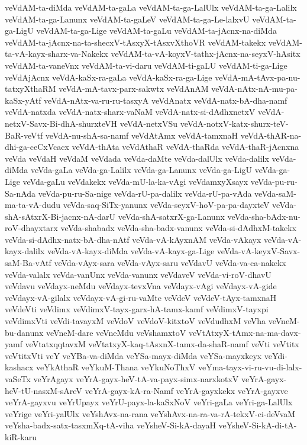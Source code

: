 {veVdAM-ta-diMda
veVdAM-ta-gaLa
veVdAM-ta-ga-LalUlx
veVdAM-ta-ga-Lalilx
veVdAM-ta-ga-Lanunx
veVdAM-ta-gaLeV
veVdAM-ta-ga-Le-lalxvU
veVdAM-ta-ga-LigU
veVdAM-ta-ga-Lige
veVdAM-ta-gaLu
veVdAM-ta-jAcnx-na-diMda
veVdAM-ta-jAcnx-na-ta-shecxV-tAsxyX-tAsxvXthoVR
veVdAM-takekx
veVdAM-ta-vA-kayx-sharx-va-Nakekx
veVdAM-ta-vA-koyxV-tathx-jAcnx-na-seyxV-hAsitx
veVdAM-ta-vaneVnx
veVdAM-ta-vi-daru
veVdAM-ti-gaLU
veVdAM-ti-ga-Lige
veVdAjAcnx
veVdA-kaSx-ra-gaLa
veVdA-kaSx-ra-ga-Lige
veVdA-mA-tAvx-pa-nu-tatxyXthaRM
veVdA-mA-tavx-parx-sakwtx
veVdAnAM
veVdA-nAtx-nA-mu-pa-kaSx-yAtf
veVdA-nAtx-va-ru-ru-tasxyA
veVdAnatx
veVdA-natx-bA-dha-namf
veVdA-natxda
veVdA-natx-sharx-vaNaM
veVdA-natx-si-dAdhxnetxV
veVdA-netxV-Savx-Bi-dhA-shurxteVH
veVdA-netxVSu
veVdA-notxV-katx-shurx-teV-BaR-veVtf
veVdA-nu-shA-sa-namf
veVdAtAmx
veVdA-tamxnaH
veVdA-thAR-na-dhi-ga-ceCxVcacx
veVdA-thAta
veVdAthaR
veVdA-thaRda
veVdA-thaR-jAcnxna
veVda
veVdaH
veVdaM
veVdada
veVda-daMte
veVda-dalUlx
veVda-dalilx
veVda-diMda
veVda-gaLa
veVda-ga-Lalilx
veVda-ga-Lanunx
veVda-ga-LigU
veVda-ga-Lige
veVda-gaLu
veVdakekx
veVda-mU-la-ka-vAgi
veVdamxyXsayx
veVda-pu-ru-Sa-nAda
veVda-pu-ru-Sa-nige
veVda-rU-pa-dalilx
veVda-rU-pa-vAda
veVda-saM-ma-ta-vA-dudu
veVda-saq-SiTx-yanunx
veVda-seyxV-hoV-pa-pa-dayxteV
veVda-shA-sAtxrX-Bi-jacnx-nA-darU
veVda-shA-satxrX-ga-Lanunx
veVda-sha-bAdx-nu-roV-dhayxtarx
veVda-shabadx
veVda-sha-badx-vanunx
veVda-si-dAdhxM-takekx
veVda-si-dAdhx-natx-bA-dha-nAtf
veVda-vA-kAyxnAM
veVda-vAkayx
veVda-vA-kayx-dalilx
veVda-vA-kayx-diMda
veVda-vA-kayx-ga-Lige
veVda-vA-keyxV-Savx-saM-Ba-vAtf
veVda-vAyx-sara
veVda-vAyx-saru
veVdavU
veVda-va-ca-nakekx
veVda-valalx
veVda-vanUnx
veVda-vanunx
veVdaveV
veVda-vi-roV-dhavU
veVdavu
veVdayx-neMdu
veVdayx-tevxVna
veVdayx-vAgi
veVdayx-vA-gide
veVdayx-vA-gilalx
veVdayx-vA-gi-ru-vaMte
veVdeV
veVdeV-tAyx-tamxnaH
veVdeVti
veVdimx
veVdimxV-tayx-garx-hA-tamx-kamf
veVdimxV-tayxpi
veVdimxVti
veVdi-tavayxM
veVdoV
veVdoV-kitxtoV
veVdudhxM
veVha
veVneM-bu-danunx
veVneM-dare
veVneMdu
veVshamxtoV
veVtAtxyX-tAmx-na-ma-davx-yamf
veVtatxqqtavxM
veVtatxyX-kaq-tAsxnX-tamx-da-shaR-namf
veVti
veVtitx
veVtitxVti
veY
veYBa-va-diMda
veYSa-mayx-diMda
veYSa-mayxkeyx
veYdi-kashacx
veYkAthaR
veYkuM-Thana
veYkuNoThxV
veYma-tayx-vi-ru-vu-di-lalx-vaSeTx
veYrAgayx
veYrA-gayx-heV-tA-va-payx-simx-narxkotxV
veYrA-gayx-heV-tU-nasxM-sAreV
veYrA-gayx-kA-ra-Namf
veYrA-gayxkekx
veYrA-gayxve
veYrA-gayxvu
veYrUpayx
veYrU-payx-la-kaSxNoV
veYri-gaLa
veYri-ga-LalUlx
veYrige
veYri-yalUlx
veYshAvx-na-rana
veYshAvx-na-ra-va-rA-tekxV-ci-deVvaM
veYsha-badx-satx-tasxmXq-tA-viha
veYsheV-Si-kA-dayaH
veYsheV-Si-kA-di-tA-kiR-karu
}
